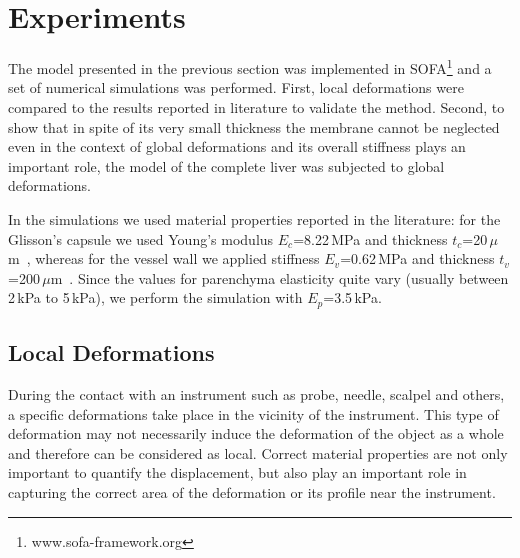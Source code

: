 \documentclass[final,3p,times,twocolumn]{elsarticle}
\begin{document}



\section{Experiments} %
The model presented in the previous section was implemented in 
SOFA\footnote{www.sofa-framework.org} and a set of
numerical simulations was performed. First, local deformations were compared to the
results reported in literature to validate the method.
Second, to show that in spite of its very small thickness the membrane cannot be
neglected even in the context of global deformations and its overall
stiffness plays an important role, the model of
the complete liver was subjected to global deformations.

In the simulations we used material properties reported in the literature: for the 
Glisson's capsule we used Young's modulus $E_c$=8.22\,MPa and thickness $t_c$=20\,$\mu$m~\cite{Umale2011},
whereas for the vessel wall we applied stiffness $E_v$=0.62\,MPa and thickness $t_v$=200\,$\mu$m~\cite{Peterlik2012}.
Since the values for parenchyma elasticity quite vary (usually between 2\,kPa to 5\,kPa), we perform the simulation 
with $E_p$=3.5\,kPa.


\subsection{Local Deformations} %
During the contact with an instrument such as probe, needle, scalpel and others,
a specific deformations take place in the vicinity of
the instrument. This type of deformation may not necessarily induce the
deformation of the object as a whole and therefore can be considered as
local. Correct material properties are not only important to quantify the
displacement, but also play an important role in capturing the correct area of
the deformation or its profile near the instrument.
\end{document}
